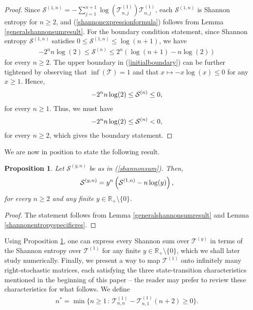 \documentclass[a4paper,12pt]{article}
\newtheorem{prop}[thm]{Proposition}
\def\R{\mathbb{R}}
\def\T{\mathcal{T}}
\begin{document}
\begin{proof}
Since $\mathcal{S}^{(1,n)} = -\sum_{j=1}^{n+1} \log(\T^{(1)}_{n,j})\T^{(1)}_{n,j}$, each $\mathcal{S}^{(1,n)}$ is Shannon entropy for $n\geq 2$, and (\ref{shannonexpressionformula}) follows from Lemma \ref{generalshannonsumresult}. For the boundary condition statement, since Shannon entropy $\mathcal{S}^{(1,n)}$ satisfies $ 0 \leq \mathcal{S}^{(1,n)} \leq \log(n+1)$, we have
\begin{align}
-2^nn\log(2) \leq \mathcal{S}^{(n)} \leq 2^n \left(\log(n+1) - n\log(2)\right) \label{initialboundary}
\end{align}
for every $n\geq 2$. The upper boundary in (\ref{initialboundary}) can be further tightened by observing that $\inf(\T) = 1$ and that $x \mapsto - x\log(x) \leq 0$ for any $x\geq 1$. Hence, 
\begin{align}
-2^nn\log(2) \leq \mathcal{S}^{(n)} \leq 0, \notag 
\end{align}
for every $n\geq 1$. Thus, we must have
\begin{align}
-2^nn\log(2) \leq \mathcal{S}^{(n)} < 0, \notag
\end{align}
for every $n \geq 2$, which gives the boundary statement.
\end{proof}
We are now in position to state the following result.
\begin{prop}
\label{shannonpropallsums}
Let $\mathcal{S}^{(y,n)}$ be as in (\ref{shannonsum}). Then,
\begin{align}
\mathcal{S}^{(y,n)} =y^n\left( \mathcal{S}^{(1,n)} - n\log(y) \right), \notag
\end{align}
for every $n\geq 2$ and any finite $y\in\R_+\setminus\{0\}$.
\end{prop}
\begin{proof}
The statement follows from Lemma \ref{generalshannonsumresult} and Lemma \ref{shannonentropyspecificres}.
\end{proof}
Using Proposition \ref{shannonpropallsums}, one can express every Shannon sum over $\T^{(y)}$ in terms of the Shannon entropy over $\T^{(1)}$ for any finite $y\in\R_+\setminus\{0\}$, which we shall later study numerically. Finally, we present a way to map $\T^{(1)}$ onto infinitely many right-stochastic matrices, each satisfying the three state-transition characteristics mentioned in the beginning of this paper -- the reader may prefer to review these characteristics for what follows.
We define
\begin{align}
n^* = \min\{n \geq 1 \, : \, \T^{(1)}_{n,n} - \T^{(1)}_{n,1}(n+2) \geq 0\}. \label{smallestnsatisfy}
\end{align}
\end{document}

